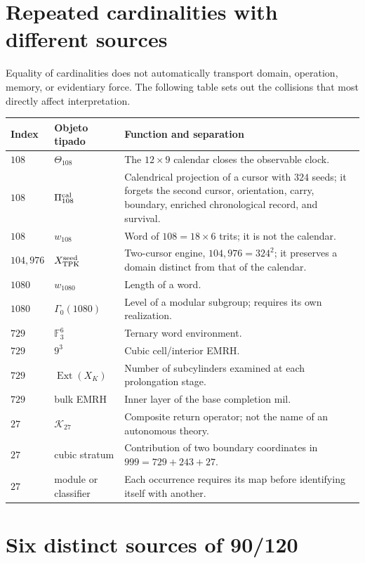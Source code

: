 \section*{Repeated cardinalities with different sources}

Equality of cardinalities does not automatically transport domain,
operation, memory, or evidentiary force. The following table sets out the
collisions that most directly affect interpretation.

\begin{longtable}{@{}p{}p{}p{}@{}}
\toprule
Index & Objeto tipado & Function and separation \\ \midrule
\endhead
\(108\)&\(\Theta_{108}\)&The \(12\times9\) calendar closes the observable
clock.\\
\(108\)&\(\Pi_{108}^{\rm cal}\)&Calendrical projection of a cursor with \(324\)
seeds; it forgets the second cursor, orientation, carry, boundary, enriched
chronological record, and
survival.\\
\(108\)&\(w_{108}\)&Word of \(108=18\times6\) trits; it is not the calendar.\\
\(104,976\)&\(X_{\rm TPK}^{\rm seed}\)&Two-cursor engine,
\(104,976=324^2\); it preserves a domain distinct from that of the calendar.\\
\(1080\)&\(w_{1080}\)&Length of a word.\\
\(1080\)&\(\Gamma_0(1080)\)&Level of a modular subgroup; requires its
own realization.\\
\(729\)&\(\mathbb F_3^6\)&Ternary word environment.\\
\(729\)&\(9^3\)&Cubic cell/interior EMRH.\\
\(729\)&\(\operatorname{Ext}(X_K)\)&Number of subcylinders examined at each
prolongation stage.\\
\(729\)&bulk EMRH&Inner layer of the base completion mil.\\
\(27\)&\(\mathcal K_{27}\)&Composite return operator; not the name of an
autonomous theory.\\
\(27\)&cubic stratum&Contribution of two boundary coordinates in
\(999=729+243+27\).\\
\(27\)&module or classifier&Each occurrence requires its map before
identifying itself with another.\\
\bottomrule
\end{longtable}

\section*{Six distinct sources of 90/120}


